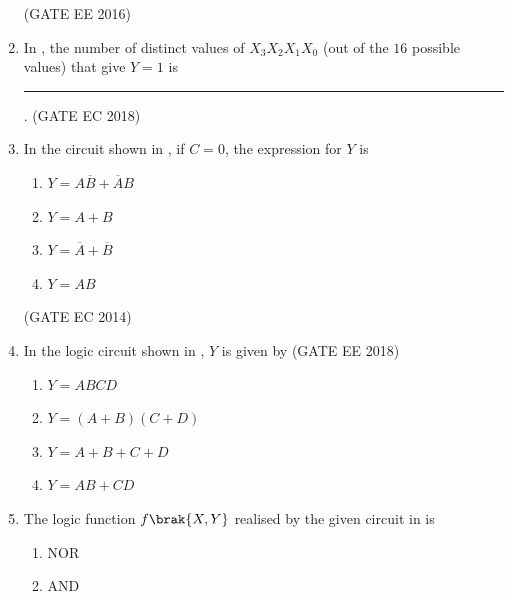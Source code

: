 \begin{enumerate}[label=\arabic*.,ref=\theenumi]
\begin{enumerate}
\end{enumerate}
\hfill(GATE EE 2016)
\begin{figure}[H]
\centering
\resizebox{0.5\columnwidth}{!}{%

	}
\caption{}
\label{EE2016_37_fig1}
\end{figure}
\item 
In
,
the number of distinct values of $X_3X_2X_1X_0$ (out of the $16$ possible values) that give $Y=1$ is \rule{1cm}{0.5pt}.
\hfill(GATE EC 2018)
\begin{figure}[H]
\centering
\resizebox{0.75\columnwidth}{!}{%

	}
	\caption{}
\label{fig:GATE-EE 2018,47}
\end{figure}
\item In the circuit shown in 
,
 if $C = 0$, the expression for $Y$ is
\begin{enumerate}
    \item $Y= A\overline{B}+ \overline{A}B $ 
    \item $Y=A+B$
    \item $Y=\overline{A}+\overline{B}$
    \item $Y=AB$
\end{enumerate}
\hfill (GATE EC 2014)
\begin{figure}[H]
\centering
\resizebox{0.75\columnwidth}{!}{%

	}
	\caption{}
\label{fig:GATE-EC 2014,15}
\end{figure}
\item In the logic circuit shown in  
,
	$Y$ is given by
\hfill(GATE EE 2018)
\begin{enumerate}
    \item $Y = ABCD$
    \item $Y = ( A + B)(C + D) $
    \item $Y = A +B +C+ D$
    \item $Y = AB+CD $
\end{enumerate}
\begin{figure}[H]
\centering
\resizebox{0.5\columnwidth}{!}{%

	}
	\caption{}
\label{fig:GATE-EE 2018,14}
\end{figure}
%
\item The logic function $f\brak{X,Y}$ realised by the given circuit in
is
\begin{enumerate}
    \item NOR
    \item AND

\end{enumerate}
\end{enumerate}
